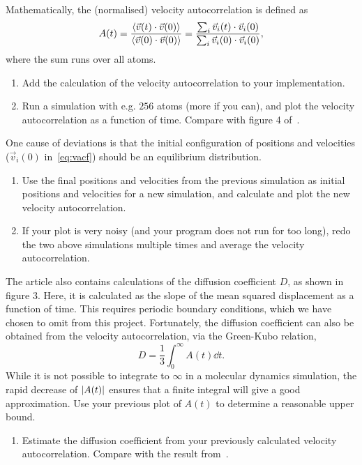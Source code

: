 \documentclass[11pt,british,a4paper]{report}
\begin{document}
Mathematically, the (normalised) velocity autocorrelation is defined as
\begin{equation}
    A(t) = \frac{\ev{\vec{v}(t)\cdot\vec{v}(0)}}{\ev{\vec{v}(0)\cdot\vec{v}(0)}}
         = \frac{\sum_i \vec{v}_i(t)\cdot\vec{v}_i(0)}{\sum_i \vec{v}_i(0)\cdot\vec{v}_i(0)},\label{eq:vacf}
\end{equation}
where the sum runs over all atoms.

\begin{enumerate}[label=\roman*.]
    \item Add the calculation of the velocity autocorrelation to your implementation.
    \item Run a simulation with e.g. \(256\) atoms (more if you can), and plot the velocity autocorrelation as a function of time. Compare with figure 4 of~\cite{Rahman_1964}.
\end{enumerate}

One cause of deviations is that the initial configuration of positions and velocities (\(\vec{v}_i(0)\) in~\vref{eq:vacf}) should be an equilibrium distribution.
\begin{enumerate}[label=\roman*.,resume]
    \item Use the final positions and velocities from the previous simulation as initial positions and velocities for a new simulation, and calculate and plot the new velocity autocorrelation.
    \item If your plot is very noisy (and your program does not run for too long), redo the two above simulations multiple times and average the velocity autocorrelation.
\end{enumerate}

The article also contains calculations of the diffusion coefficient \(D\), as shown in figure 3. Here, it is calculated as the slope of the mean squared displacement as a function of time. This requires periodic boundary conditions, which we have chosen to omit from this project. Fortunately, the diffusion coefficient can also be obtained from the velocity autocorrelation, via the Green-Kubo relation,
\[
    D = \frac{1}{3}\int_0^\infty A(t)\dd{t}.
\]
While it is not possible to integrate to \(\infty\) in a molecular dynamics simulation, the rapid decrease of \(\abs{A(t)}\) ensures that a finite integral will give a good approximation. Use your previous plot of \(A(t)\) to determine a reasonable upper bound.

\begin{enumerate}[label=\roman*.,resume]
    \item Estimate the diffusion coefficient from your previously calculated velocity autocorrelation. Compare with the result from~\cite{Rahman_1964}.
\end{enumerate}
\end{document}
